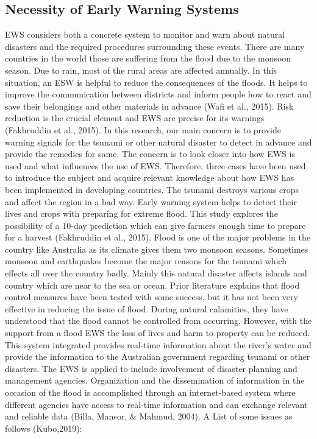 \subsection{Necessity of Early Warning Systems}\label{sec:necessity_of_early_warning}

EWS considers both a concrete system to monitor and warn about natural disasters and the required procedures surrounding these events. 
There are many countries in the world those are suffering from the flood due to the monsoon season.  Due to rain, most of the rural areas are affected annually. In this situation, an ESW is helpful to reduce the consequences of the floods. It helps to improve the communication between districts and inform people how  to react and save their belongings and other materials in advance (Wafi et al., 2015).   Risk reduction is the crucial element and EWS are precise for its warnings (Fakhruddin et al., 2015). In this research, our main concern is to provide warning signals for the tsunami or other natural disaster to detect in advance and provide the remedies for same. The concern is to look closer into how EWS is used and what influences the use of EWS. Therefore, three cases have been used to introduce the subject and acquire relevant knowledge about how EWS has been implemented in developing countries. The tsunami destroys various crops and affect the region in a bad way.   Early warning system helps to detect their lives and crops with preparing for extreme flood. This study explores the possibility of a 10-day prediction which can give farmers enough time to prepare for a harvest (Fakhruddin et al., 2015).
Flood is one of the major problems in the country like Australia as its climate  gives them two monsoon seasons. Sometimes monsoon and earthquakes become the major reasons for the tsunami which effects  all over the country badly. Mainly this natural disaster affects islands and country which are near to the sea or ocean. Prior literature explains that flood control measures have been tested with some success, but it has not been very effective in reducing the issue of flood. During natural calamities, they have understood that the flood cannot be  controlled from occurring. However, with the support from a flood EWS the loss of lives and harm to property can be reduced. This system integrated provides real-time information about the river’s water and provide the information to the Australian government regarding tsunami or other disasters. The EWS is applied to include involvement of disaster planning and management agencies. Organization and the dissemination of information in the occasion of the flood is accomplished through an internet-based system where different agencies have access to real-time information and can exchange relevant and reliable data (Billa, Mansor, & Mahmud, 2004).
A List of some issues as follows (Kubo,2019):

